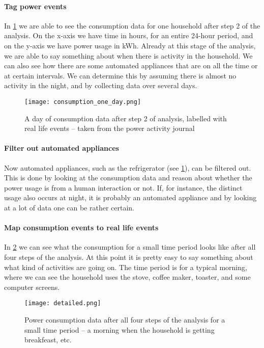 \paragraph{Tag power events}
In \cref{consumption_one_day} we are able to see the consumption data for one household after step 2 of the analysis.
On the x-axis we have time in hours, for an entire 24-hour period, and on the y-axis we have power usage in kWh.
Already at this stage of the analysis, we are able to say something about when there is activity in the household.
We can also see how there are some automated appliances that are on all the time or at certain intervals.
We can determine this by assuming there is almost no activity in the night, and by collecting data over several days.

\begin{figure}
  \begin{center}
    \texttt{[image: consumption\_one\_day.png]}
  \end{center}
  \caption{A day of consumption data after step 2 of analysis, labelled with real life events -- taken from the power activity journal}
  \label{consumption_one_day}
\end{figure}

\paragraph{Filter out automated appliances}
Now automated appliances, such as the refrigerator (see \cref{consumption_one_day}), can be filtered out.
This is done by looking at the consumption data and reason about whether the power usage is from a human interaction or not.
If, for instance, the distinct usage also occurs at night, it is probably an automated appliance and by looking at a lot of data one can be rather certain.

\paragraph{Map consumption events to real life events}
In \cref{detailed_consumption} we can see what the consumption for a small time period looks like after all four steps of the analysis.
At this point it is pretty easy to say something about what kind of activities are going on.
The time period is for a typical morning, where we can see the household uses the stove, coffee maker, toaster, and some computer screens.

\begin{figure}[h]
  \begin{center}
    \texttt{[image: detailed.png]}
  \end{center}
  \caption{Power consumption data after all four steps of the analysis for a small time period -- a morning when the household is getting breakfeast, etc.}
  \label{detailed_consumption}
\end{figure}


